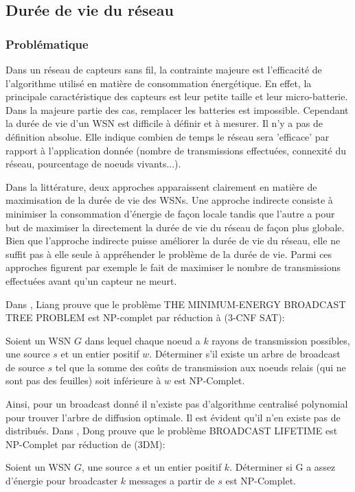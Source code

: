 \subsection{Durée de vie du réseau}
\subsubsection{Problématique}


Dans un réseau de capteurs sans fil, la contrainte majeure est l'efficacité de l'algorithme utilisé en matière de consommation énergétique. En effet, la principale caractéristique des capteurs
est leur petite taille et leur micro-batterie. Dans la majeure partie des cas, remplacer les batteries est impossible. Cependant la durée de vie d'un WSN est difficile à définir et à mesurer.
Il n'y a pas de définition absolue. Elle indique combien de temps le réseau sera 'efficace' par rapport à l'application donnée (nombre de transmissions effectuées, connexité du réseau, pourcentage de noeuds vivants...).

Dans la littérature, deux approches apparaissent clairement en matière de maximisation de la durée de vie des WSNs. Une approche indirecte consiste à minimiser la consommation d'énergie de façon locale tandis que l'autre a pour but 
de maximiser la directement la durée de vie du réseau de façon plus globale. Bien que l'approche indirecte puisse améliorer la durée de vie du réseau, elle ne suffit pas à elle seule à appréhender le problème de la durée de vie.
Parmi ces approches figurent  par exemple le fait de maximiser le nombre de transmissions effectuées avant qu'un capteur ne meurt.

Dans \cite{Liang2002}, Liang prouve que le  problème THE MINIMUM-ENERGY BROADCAST
TREE PROBLEM est NP-complet par réduction à (3-CNF SAT):
\begin{myth}
Soient un WSN $G$ dans lequel chaque noeud a $k$ rayons de transmission possibles, une source $s$ et un entier positif $w$.
Déterminer s'il existe un arbre de broadcast de source $s$ tel que la somme des coûts de transmission aux noeuds relais (qui ne sont pas des feuilles) soit inférieure à $w$ est NP-Complet.
\end{myth}
Ainsi, pour un broadcast donné il n'existe pas d'algorithme centralisé polynomial pour trouver l'arbre de diffusion optimale. Il est évident qu'il n'en existe pas de distribués. 
Dans \cite{Dong2005}, Dong prouve que le  problème BROADCAST LIFETIME est NP-Complet par réduction de (3DM):
\begin{myth}
Soient un WSN $G$, une source $s$ et un entier positif $k$.
Déterminer si G a assez d'énergie pour broadcaster $k$ messages a partir de $s$ est NP-Complet.
\end{myth}

